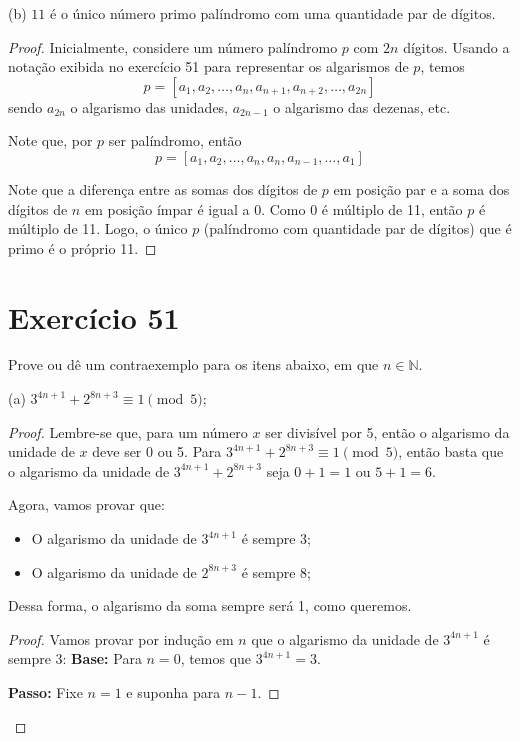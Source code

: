 \documentclass{article}
\newcommand{\base}{\textbf{Base: }}
\newcommand{\passo}{\textbf{Passo: }}
\begin{document}
(b) $11$ é o único número primo palíndromo com uma quantidade par de dígitos.

\begin{proof}
Inicialmente, considere um número palíndromo $p$ com $2n$ dígitos.
Usando a notação exibida no exercício 51 para representar os algarismos de $p$, temos
\[ p = [a_1 , a_2 , \dots , a_{n} , a_{n+1} , a_{n+2} , \dots , a_{2n} ] \]
sendo $a_{2n}$ o algarismo das unidades, $a_{2n-1}$ o algarismo das dezenas, etc.

Note que, por $p$ ser palíndromo, então 
\[ p = [ a_1, a_2, \dots, a_n, a_n, a_{n-1}, \dots, a_1 ] \]

Note que a diferença entre as somas dos dígitos de $p$ em posição par e a soma dos dígitos de $n$ em posição ímpar é igual a 0.
Como 0 é múltiplo de 11, então $p$ é múltiplo de 11.
Logo, o único $p$ (palíndromo com quantidade par de dígitos) que é primo é o próprio 11.

\end{proof}

\section*{Exercício 51}

Prove ou dê um contraexemplo para os itens abaixo, em que $n\in\mathbb{N}$.

(a) $3^{4n+1} + 2^{8n+3}\equiv 1\pmod 5$;
\begin{proof}
Lembre-se que, para um número $x$ ser divisível por 5, então o algarismo da unidade de $x$ deve ser 0 ou 5.
Para $3^{4n+1} + 2^{8n+3} \equiv 1\pmod 5$, então basta que o algarismo da unidade de $3^{4n+1} + 2^{8n+3}$ seja $0+1 = 1$ ou $5+1=6$.

Agora, vamos provar que:
\begin{itemize}
  \item O algarismo da unidade de $3^{4n+1}$ é sempre 3;
  \item O algarismo da unidade de $2^{8n+3}$ é sempre 8;
\end{itemize}
Dessa forma, o algarismo da soma sempre será 1, como queremos.

\begin{proof} Vamos provar por indução em $n$ que o algarismo da unidade de $3^{4n+1}$ é sempre 3:
\base Para $n=0$, temos que $3^{4n+1} = 3$.

\passo Fixe $n=1$ e suponha para $n-1$.
\end{proof}

\end{proof}
\end{document}
